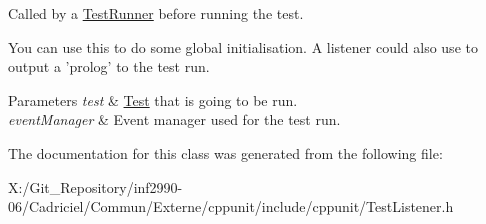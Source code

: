 Called by a \hyperlink{class_test_runner}{Test\-Runner} before running the test. 

You can use this to do some global initialisation. A listener could also use to output a 'prolog' to the test run.


\begin{DoxyParams}{Parameters}
{\em test} & \hyperlink{class_test}{Test} that is going to be run. \\
\hline
{\em event\-Manager} & Event manager used for the test run. \\
\hline
\end{DoxyParams}


The documentation for this class was generated from the following file\-:\begin{DoxyCompactItemize}
\item 
X\-:/\-Git\-\_\-\-Repository/inf2990-\/06/\-Cadriciel/\-Commun/\-Externe/cppunit/include/cppunit/Test\-Listener.\-h\end{DoxyCompactItemize}
